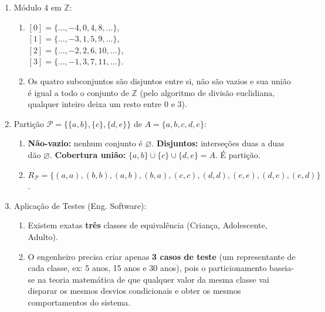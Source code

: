 \documentclass[12pt]{article}
\begin{document}
\begin{enumerate}
\item Módulo 4 em $\mathbb{Z}$:
\begin{enumerate}[label=\alph*)]
    \item $[0] = \{ \dots, -4, 0, 4, 8, \dots \}$,\\
    $[1] = \{ \dots, -3, 1, 5, 9, \dots \}$,\\
    $[2] = \{ \dots, -2, 2, 6, 10, \dots \}$,\\
    $[3] = \{ \dots, -1, 3, 7, 11, \dots \}$.
    \item Os quatro subconjuntos são disjuntos entre si, não são vazios e sua união é igual a todo o conjunto de $\mathbb{Z}$ (pelo algoritmo de divisão euclidiana, qualquer inteiro deixa um resto entre 0 e 3).
\end{enumerate}

\item Partição $\mathcal{P} = \{\{a, b\}, \{c\}, \{d, e\}\}$ de $A = \{a, b, c, d, e\}$:
\begin{enumerate}[label=\alph*)]
    \item \textbf{Não-vazio:} nenhum conjunto é $\varnothing$. \textbf{Disjuntos:} interseções duas a duas dão $\varnothing$. \textbf{Cobertura união:} $\{a,b\} \cup \{c\} \cup \{d,e\} = A$. É partição.
    \item $R_\mathcal{P} = \{(a,a), (b,b), (a,b), (b,a), (c,c), (d,d), (e,e), (d,e), (e,d)\}$.
\end{enumerate}

\item Aplicação de Testes (Eng. Software):
\begin{enumerate}[label=\alph*)]
    \item Existem exatas \textbf{três} classes de equivalência (Criança, Adolescente, Adulto).
    \item O engenheiro precisa criar apenas \textbf{3 casos de teste} (um representante de cada classe, ex: 5 anos, 15 anos e 30 anos), pois o particionamento baseia-se na teoria matemática de que qualquer valor da mesma classe vai disparar os mesmos desvios condicionais e obter os mesmos comportamentos do sistema.
\end{enumerate}

\end{enumerate}
\end{document}
